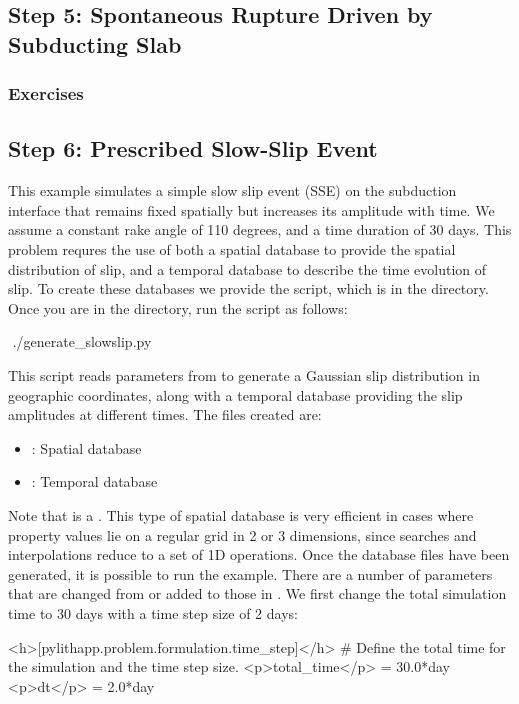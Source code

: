 \subsection{Step 5: Spontaneous Rupture Driven by Subducting Slab}

\subsubsection{Exercises}

\subsection{Step 6: Prescribed Slow-Slip Event}

This example simulates a simple slow slip event (SSE) on the
subduction interface that remains fixed spatially but increases its
amplitude with time. We assume a constant rake angle of 110 degrees,
and a time duration of 30 days. This problem requres the use of both a
spatial database to provide the spatial distribution of slip, and a
temporal database to describe the time evolution of slip. To create
these databases we provide the 
script, which is in the  directory. Once you are
in the  directory, run the script as follows:
\begin{shell}
$$ ./generate_slowslip.py
\end{shell}
This script reads parameters from  to
generate a Gaussian slip distribution in geographic coordinates, along
with a temporal database providing the slip amplitudes at different
times. The files created are:
\begin{itemize}
\item {}: Spatial database
\item {}: Temporal database
\end{itemize}

Note that  is a
. This type of spatial database is very
efficient in cases where property values lie on a regular grid in 2 or
3 dimensions, since searches and interpolations reduce to a set of 1D
operations. Once the database files have been generated, it is
possible to run the example. There are a number of parameters that are
changed from or added to those in . We first
change the total simulation time to 30 days with a time step size of 2
days:
\begin{cfg}
<h>[pylithapp.problem.formulation.time_step]</h>
# Define the total time for the simulation and the time step size.
<p>total_time</p> = 30.0*day
<p>dt</p> = 2.0*day
\end{cfg}

